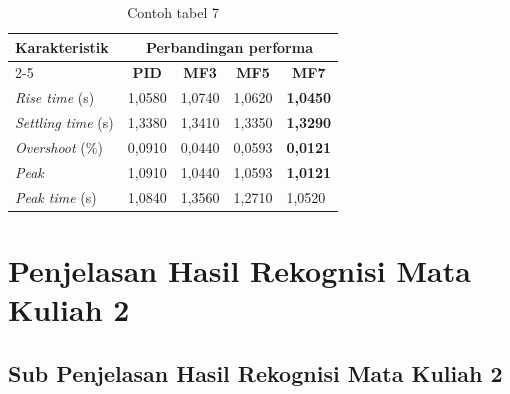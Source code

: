 \begin{table}[H]
    \centering
    \caption{Contoh tabel 7}
    \label{t perbandinganRespon}
    \begin{tabular}{lllll}
        \hline
        \multirow{2}{*}{Karakteristik} & \multicolumn{4}{c}{Perbandingan performa} \\ \cline{2-5} 
        & \multicolumn{1}{c}{\textbf{PID}} & \multicolumn{1}{c}{\textbf{MF3}} & \multicolumn{1}{c}{\textbf{MF5}} & \multicolumn{1}{c}{\textbf{MF7}} \\ \hline
        \textit{Rise time} (s)  & 1,0580  & 1,0740  & 1,0620    & \textbf{1,0450} \\
        \textit{Settling time} (s) & 1,3380 & 1,3410  & 1,3350  & \textbf{1,3290} \\
        \textit{Overshoot} (\%) & 0,0910 & 0,0440  & 0,0593     & \textbf{0,0121} \\
        \textit{Peak} & 1,0910 & 1,0440 & 1,0593 & \textbf{1,0121} \\
        \textit{Peak time} (s) & 1,0840 & 1,3560  & 1,2710      & 1,0520  \\ \hline
    \end{tabular}
\end{table}

\section{Penjelasan Hasil Rekognisi Mata Kuliah 2}
\lipsum[1]

\subsection{Sub Penjelasan Hasil Rekognisi Mata Kuliah 2}
\lipsum[1]